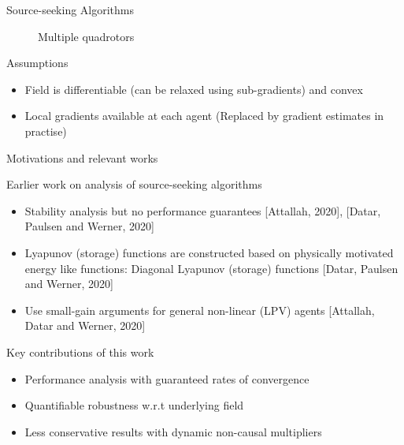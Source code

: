\documentclass{beamer}
\begin{document}
\begin{frame}{Source-seeking Algorithms}
\begin{figure}[!htb]
\begin{minipage}{0.5\textwidth}
			\caption{Multiple quadrotors}
			\label{fig:multiple_quads}
		\end{minipage}
		\end{figure}
	\begin{block}{Assumptions}
		\begin{itemize}		
			\item Field is differentiable (can be relaxed using sub-gradients) and convex
			\item Local gradients available at each agent (Replaced by gradient estimates in practise)
		\end{itemize}		
	\end{block}
\end{frame}
\begin{frame}{Motivations and relevant works}
	\begin{block}{Earlier work on analysis of source-seeking algorithms}
	\begin{itemize}
		\item Stability analysis but no performance guarantees [Attallah, 2020], [Datar, Paulsen and Werner, 2020]
		\item Lyapunov (storage) functions are constructed based on physically motivated energy like functions: Diagonal Lyapunov (storage) functions [Datar, Paulsen and Werner, 2020]
		\item Use small-gain arguments for general non-linear (LPV) agents [Attallah, Datar and Werner, 2020]
	\end{itemize}
	\end{block}	
	\begin{block}{Key contributions of this work}
	\begin{itemize}
		\item Performance analysis with guaranteed rates of convergence
		\item Quantifiable robustness w.r.t underlying field
		\item Less conservative results with dynamic non-causal multipliers
	\end{itemize}
\end{block}
\end{frame}
\end{document}
